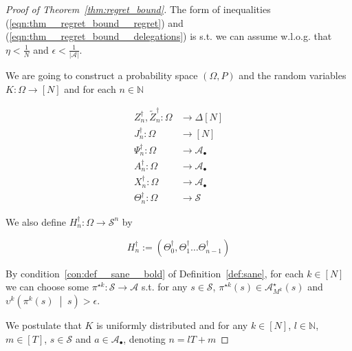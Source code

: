 \documentclass[anon,12pt]{colt2018} %
\newcommand{\Comment}[1]{}
\newcommand{\AP}[1]{\left(#1\right)}
\newcommand{\APM}[2]{\left(#1\;\middle\vert\;#2\right)}
\newcommand{\Nats}{\mathbb{N}}
\newcommand{\Abs}[1]{\left\vert #1 \right\vert}
\newcommand{\A}{\mathcal{A}}
\newcommand{\St}{\mathcal{S}}
\newcommand{\Ad}{\upsilon}
\newcommand{\X}{\bullet}
\begin{document}
\begin{proof}[Proof of Theorem~\ref{thm:regret_bound}]

The form of inequalities (\ref{eqn:thm__regret_bound__regret}) and (\ref{eqn:thm__regret_bound__delegations}) is s.t. we can assume w.l.o.g. that $\eta < \frac{1}{N}$ and $\epsilon < \frac{1}{\Abs{\A}}$.

\Comment{To avoid cumbersome notation, whenever $M^k$ should appear a subscript, we will replace it by $k$. }We are going to construct a probability space $(\Omega,P)$ and the random variables $K: \Omega \rightarrow [N]$ and for each $n\in\Nats$

\begin{align*}
Z^\dagger_n,\tilde{Z}^\dagger_n: \Omega &\rightarrow \Delta[N]\\ 
J^\dagger_n: \Omega &\rightarrow [N]\\
\Psi^\dagger_n: \Omega &\rightarrow \A_\X\\
A^\dagger_n: \Omega &\rightarrow \A_\X\\
X^\dagger_n: \Omega &\rightarrow \A_\X\\
\Theta^\dagger_n: \Omega &\rightarrow \St
\end{align*}

We also define $H^\dagger_n: \Omega \rightarrow \St^n$ by

$$H^\dagger_n:= \AP{\Theta^\dagger_0,\Theta^\dagger_1 \dots \Theta^\dagger_{n-1}}$$

By condition~\ref{con:def__sane__bold} of Definition~\ref{def:sane}, for each $k\in[N]$ we can choose some $\pi^{\star k}: \St \rightarrow \A$ s.t. for any $s \in \St$, $\pi^{\star k}(s) \in \A_{M^k}^\star(s)$ and $\Ad^k\APM{\pi^k(s)}{s} > \epsilon$.

We postulate that $K$ is uniformly distributed and for any $k \in [N]$, $l \in \Nats$, $m \in [T]$, $s\in\St$ and $a\in\A_\X$, denoting $n = lT+m$


\end{proof}
\end{document}
